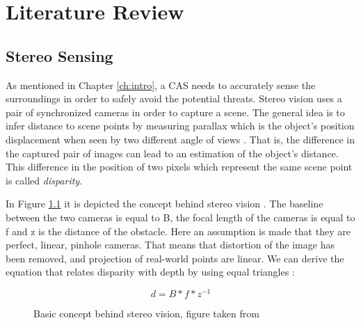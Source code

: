 \chapter{Literature Review}\label{ch:literature}
\acresetall

\section{Stereo Sensing} \label{ch:literature:obstacle_avoidance:sensing:stereo_vision}

As mentioned in Chapter \ref{ch:intro}, a \ac{CAS} needs to accurately sense the surroundings in order to safely avoid the potential threats. Stereo vision uses a pair of synchronized cameras in order to capture a scene. The general idea is to infer distance to scene points by measuring parallax which is the object's position displacement when seen by two different angle of views \cite{cse_lecture}. That is, the difference in the captured pair of images can lead to an estimation of the object's distance. This difference in the position of two pixels which represent the same scene point is called \textit{disparity}.

In Figure \ref{stereo_setup} it is depicted the concept behind stereo vision \cite{Dijk}. The baseline between the two cameras is equal to B, the focal length of the cameras is equal to f and z is the distance of the obstacle. Here an assumption is made that they are perfect, linear, pinhole cameras. That means that distortion of the image has been removed, and projection of real-world points are linear. We can derive the equation that relates disparity with depth by using equal triangles \cite{Dijk}:

\begin{equation} \label{eq:disparity_depth}
d = B * f * z^{-1}
\end{equation}

\begin{figure}[]
  \caption{Basic concept behind stereo vision, figure taken from \cite{Dijk}}
  \label{stereo_setup}
\end{figure}

